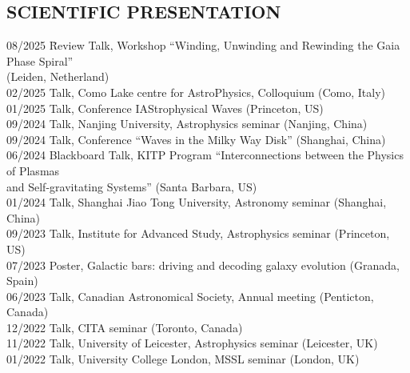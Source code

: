 \documentclass[]{res}
\begin{document}
\begin{resume}
\section{SCIENTIFIC PRESENTATION}
\noindent
\begin{tabbing}
    08/2025 \hspace{2mm} \=Review Talk, Workshop ``Winding, Unwinding and Rewinding the Gaia Phase Spiral''\\
                         \>(Leiden, Netherland)\\
    02/2025 \hspace{2mm} \>Talk, Como Lake centre for AstroPhysics, Colloquium (Como, Italy)\\
    01/2025 \hspace{2mm} \>Talk, Conference IAStrophysical Waves (Princeton, US)\\
    09/2024 \hspace{2mm} \>Talk, Nanjing University, Astrophysics seminar (Nanjing, China)\\
    09/2024 \hspace{2mm} \>Talk, Conference ``Waves in the Milky Way Disk'' (Shanghai, China)\\
    06/2024 \hspace{2mm} \>Blackboard Talk, KITP Program ``Interconnections between the Physics of Plasmas\\
                         \>and Self-gravitating Systems'' (Santa Barbara, US)\\
    01/2024 \hspace{2mm} \>Talk, Shanghai Jiao Tong University, Astronomy seminar (Shanghai, China)\\
    09/2023 \hspace{2mm} \>Talk, Institute for Advanced Study, Astrophysics seminar (Princeton, US)\\
    07/2023 \hspace{2mm} \>Poster, Galactic bars: driving and decoding galaxy evolution (Granada, Spain)\\
    06/2023 \hspace{2mm} \>Talk, Canadian Astronomical Society, Annual meeting (Penticton, Canada)\\
    12/2022 \hspace{2mm} \>Talk, CITA seminar (Toronto, Canada)\\
    11/2022 \hspace{2mm} \>Talk, University of Leicester, Astrophysics seminar (Leicester, UK)\\
    01/2022 \hspace{2mm} \>Talk, University College London, MSSL seminar (London, UK)\\

\end{tabbing}
\end{resume}
\end{document}
